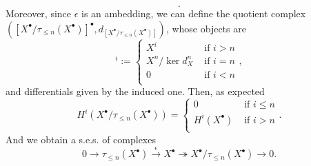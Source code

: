 \begin{defn}
\begin{equation}
	.\end{equation} 
	Moreover, since $\epsilon$ is an ambedding, we can define the quotient complex
	$\left( [X^\bullet/\tau_{\leq n}(X^\bullet)]^{\bullet}, d_{[X^\bullet/\tau_{\leq n}(X^\bullet)]} \right)$,
	whose objects are
	\begin{equation}
		[X^\bullet/\tau_{\leq n}(X^\bullet)]^i := 
	\begin{cases}
		X^i & \text{ if } i > n\\
		X^n/\ker d_X^n & \text{ if } i = n\\
		0 & \text{ if } i < n\\
	\end{cases} 
	,\end{equation} 
	and differentials given by the induced one.
	Then, as expected
	\begin{equation}
		H^i \left( X^\bullet/\tau_{\leq n}(X^\bullet) \right) =
		\begin{cases}
			0 & \text{ if } i \leq n\\
			H^i(X^\bullet) & \text{ if } i > n\\
		\end{cases} 
	.\end{equation} 
	And we obtain a s.e.s. of complexes
	\begin{equation}
		0 \to\tau_{\leq n}(X^\bullet) \xrightarrow{\epsilon} X^\bullet
		\twoheadrightarrow X^\bullet/\tau_{\leq n}(X^\bullet) \to 0
	.\end{equation} 
\end{defn}

